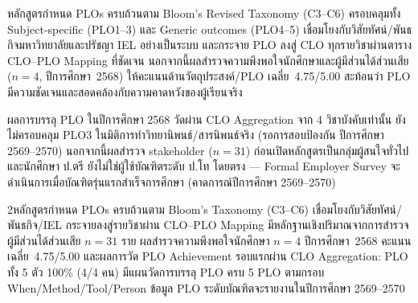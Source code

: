 \begin{strengthbox}
หลักสูตรกำหนด PLOs ครบถ้วนตาม Bloom's Revised Taxonomy (C3--C6) ครอบคลุมทั้ง Subject-specific (PLO1--3) และ Generic outcomes (PLO4--5) เชื่อมโยงกับวิสัยทัศน์/พันธกิจมหาวิทยาลัยและปรัชญา IEL อย่างเป็นระบบ และกระจาย PLO ลงสู่ CLO ทุกรายวิชาผ่านตาราง CLO--PLO Mapping ที่ชัดเจน นอกจากนี้ผลสำรวจความพึงพอใจนักศึกษาและผู้มีส่วนได้ส่วนเสีย ($n=4$, ปีการศึกษา~2568) ให้คะแนนด้านวัตถุประสงค์/PLO เฉลี่ย~4.75/5.00 สะท้อนว่า PLO มีความชัดเจนและสอดคล้องกับความคาดหวังของผู้เรียนจริง
\end{strengthbox}

\begin{weaknessbox}
ผลการบรรลุ PLO ในปีการศึกษา 2568 วัดผ่าน CLO Aggregation จาก 4 วิชาบังคับเท่านั้น ยังไม่ครอบคลุม PLO3 ในมิติการทำวิทยานิพนธ์/สารนิพนธ์จริง (รอการสอบป้องกัน ปีการศึกษา 2569--2570) นอกจากนี้ผลสำรวจ stakeholder ($n=31$) ก่อนเปิดหลักสูตรเป็นกลุ่มผู้สนใจทั่วไปและนักศึกษา ป.ตรี ยังไม่ใช่ผู้ใช้บัณฑิตระดับ ป.โท โดยตรง --- Formal Employer Survey จะดำเนินการเมื่อบัณฑิตรุ่นแรกสำเร็จการศึกษา (คาดการณ์ปีการศึกษา 2569--2570)
\end{weaknessbox}

\begin{selfassessmentbox}{2}{หลักสูตรกำหนด PLOs ครบถ้วนตาม Bloom's Taxonomy (C3--C6) เชื่อมโยงกับวิสัยทัศน์/พันธกิจ/IEL กระจายลงสู่รายวิชาผ่าน CLO--PLO Mapping มีหลักฐานเชิงปริมาณจากการสำรวจผู้มีส่วนได้ส่วนเสีย $n=31$ ราย ผลสำรวจความพึงพอใจนักศึกษา $n=4$ ปีการศึกษา~2568 คะแนนเฉลี่ย~4.75/5.00 และผลการวัด PLO Achievement รอบแรกผ่าน CLO Aggregation: PLO ทั้ง 5 ตัว 100\% (4/4 คน) มีแผนวัดการบรรลุ PLO ครบ 5 PLO ตามกรอบ When/Method/Tool/Person ข้อมูล PLO ระดับบัณฑิตจะรายงานในปีการศึกษา 2569--2570}
\end{selfassessmentbox}

